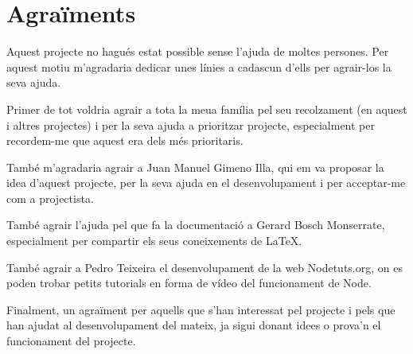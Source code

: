 \chapter*{Agraïments}

Aquest projecte no hagués estat possible sense l'ajuda de moltes persones. Per aquest motiu m'agradaria dedicar unes línies a cadascun d'ells per agrair-los la seva ajuda.

Primer de tot voldria agrair a tota la meua família pel seu recolzament (en aquest i altres projectes) i per la seva ajuda a prioritzar projecte, especialment per recordem-me que aquest era dels més prioritaris. 

També m'agradaria agrair a Juan Manuel Gimeno Illa, qui em va proposar la idea d'aquest projecte, per la seva ajuda en el desenvolupament i per acceptar-me com a projectista. 

També agrair l'ajuda pel que fa la documentació a Gerard Bosch Monserrate, especialment per compartir els seus coneixements de \LaTeX.

També agrair a Pedro Teixeira el desenvolupament de la web Nodetuts.org, on es poden trobar petits tutorials en forma de vídeo del funcionament de Node.

Finalment, un agraïment per aquells que s'han interessat pel projecte i pels que han ajudat al desenvolupament del mateix, ja sigui donant idees o prova'n el funcionament del projecte. 

